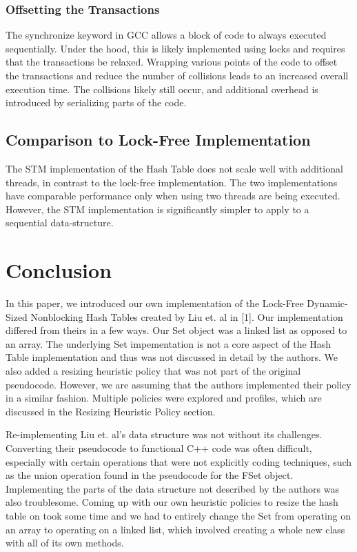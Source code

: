 \documentclass[11pt]{article} %
\begin{document}
\subsubsection{Offsetting the Transactions}

The synchronize keyword in GCC allows a block of code to always executed sequentially. Under the hood, this is likely implemented using locks and requires that the transactions be relaxed. Wrapping various points of the code to offset the transactions and reduce the number of collisions leads to an increased overall execution time. The collisions likely still occur, and additional overhead is introduced by serializing parts of the code.

\subsection{Comparison to Lock-Free Implementation}

The STM implementation of the Hash Table does not scale well with additional threads, in contrast to the lock-free implementation. The two implementations have comparable performance only when using two threads are being executed. However, the STM implementation is significantly simpler to apply to a sequential data-structure.

\section{Conclusion}

In this paper, we introduced our own implementation of the Lock-Free Dynamic-Sized Nonblocking Hash Tables created by Liu et. al in [1]. Our implementation differed from theirs in a few ways. Our Set object was a linked list as opposed to an array. The underlying Set impementation is not a core aspect of the Hash Table implementation and thus was not discussed in detail by the authors. We also added a resizing heuristic policy that was not part of the original pseudocode. However, we are assuming that the authors implemented their policy in a similar fashion. Multiple policies were explored and profiles, which are discussed in the Resizing Heuristic Policy section.

Re-implementing Liu et. al's data structure was not without its challenges. Converting their pseudocode to functional C++ code was often difficult, especially with certain operations that were not explicitly coding techniques, such as the union operation found in the pseudocode for the FSet object. Implementing the parts of the data structure not described by the authors was also troublesome. Coming up with our own heuristic policies to resize the hash table on took some time and we had to entirely change the Set from operating on an array to operating on a linked list, which involved creating a whole new class with all of its own methods. 
\end{document}

